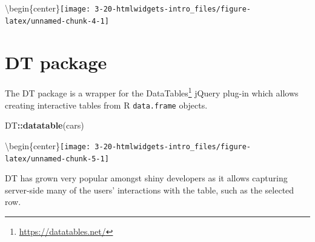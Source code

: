 \documentclass[
]{krantz}
\makeatletter
\newenvironment{Shaded}{\begin{snugshade}}{\end{snugshade}}
\newcommand{\ControlFlowTok}[1]{\textcolor[rgb]{0.27,0.27,0.27}{\textbf{#1}}}
\newcommand{\DecValTok}[1]{\textcolor[rgb]{0.06,0.06,0.06}{#1}}
\newcommand{\KeywordTok}[1]{\textcolor[rgb]{0.27,0.27,0.27}{\textbf{#1}}}
\newcommand{\NormalTok}[1]{#1}
\newcommand{\OperatorTok}[1]{\textcolor[rgb]{0.43,0.43,0.43}{\textbf{#1}}}
\newcommand{\StringTok}[1]{\textcolor[rgb]{0.5,0.5,0.5}{#1}}
\renewcommand{\href}[2]{#2\footnote{\url{#1}}}
\newenvironment{kframe}{%
\medskip{}
\setlength{\fboxsep}{.8em}
 \def\at@end@of@kframe{}%
 \ifinner\ifhmode%
  \def\at@end@of@kframe{\end{minipage}}%
  \begin{minipage}{\columnwidth}%
 \fi\fi%
 \def\FrameCommand##1{\hskip\@totalleftmargin \hskip-\fboxsep
 \colorbox{shadecolor}{##1}\hskip-\fboxsep
     \hskip-\linewidth \hskip-\@totalleftmargin \hskip\columnwidth}%
 \MakeFramed {\advance\hsize-\width
   \@totalleftmargin\z@ \linewidth\hsize
   \@setminipage}}%
 {\par\unskip\endMakeFramed%
 \at@end@of@kframe}
\renewenvironment{Shaded}{\begin{kframe}}{\end{kframe}}
\makeatother
\begin{document}
\textbackslash begin\{center\}\texttt{[image: 3-20-htmlwidgets-intro\_files/figure-latex/unnamed-chunk-4-1]}

\hypertarget{widgets-intro-dt}{%
\section{DT package}\label{widgets-intro-dt}}

The DT package \citep{R-DT} is a wrapper for the \href{https://datatables.net/}{DataTables} jQuery plug-in which allows creating interactive tables from R \texttt{data.frame} objects.

\begin{Shaded}
\begin{Highlighting}[]
\NormalTok{DT}\OperatorTok{::}\KeywordTok{datatable}\NormalTok{(cars)}
\end{Highlighting}
\end{Shaded}

\textbackslash begin\{center\}\texttt{[image: 3-20-htmlwidgets-intro\_files/figure-latex/unnamed-chunk-5-1]}

DT has grown very popular amongst shiny developers as it allows capturing server-side many of the users' interactions with the table, such as the selected row.

\begin{Shaded}
\end{Shaded}
\end{document}
